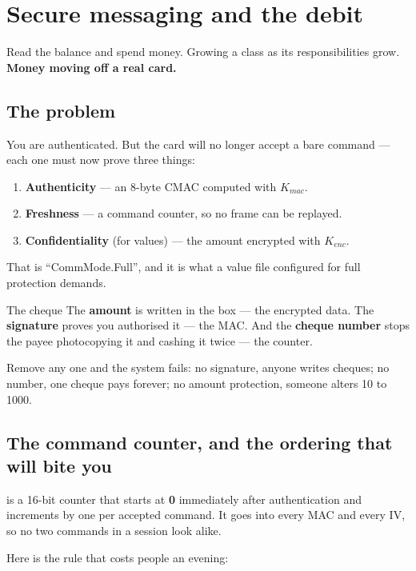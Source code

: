 \chapter{Secure messaging and the debit}
\label{ch:secmsg}

\chapterbrief
  {Read the balance and spend money.}
  {Growing a class as its responsibilities grow.}
  {\textbf{Money moving off a real card.}}

\section{The problem}

You are authenticated. But the card will no longer accept a bare command --- each
one must now prove three things:

\begin{enumerate}
  \item \textbf{Authenticity} --- an 8-byte CMAC computed with $K_{mac}$.
  \item \textbf{Freshness} --- a command counter, so no frame can be replayed.
  \item \textbf{Confidentiality} (for values) --- the amount encrypted with $K_{enc}$.
\end{enumerate}

That is ``CommMode.Full'', and it is what a value file configured for full
protection demands.

\begin{analogy}{The cheque}
The \textbf{amount} is written in the box --- the encrypted data. The
\textbf{signature} proves you authorised it --- the MAC. And the \textbf{cheque
number} stops the payee photocopying it and cashing it twice --- the counter.

Remove any one and the system fails: no signature, anyone writes cheques; no
number, one cheque pays forever; no amount protection, someone alters 10 to 1000.
\end{analogy}

\section{The command counter, and the ordering that will bite you}

 is a 16-bit counter that starts at \textbf{0} immediately after
authentication and increments by one per accepted command. It goes into every MAC
and every IV, so no two commands in a session look alike.

Here is the rule that costs people an evening:

